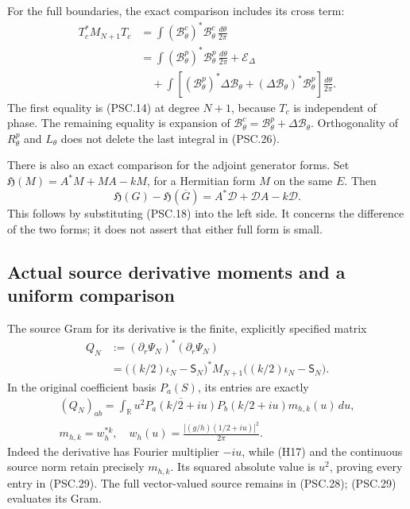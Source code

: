For the full boundaries, the exact comparison includes its cross term:
\[
 \begin{aligned}
 T_c^*M_{N+1}T_c
 &=\int(\mathscr B^c_\theta)^*\mathscr B^c_\theta
             \,\frac{d\theta}{2\pi}\\
 &=\int(\mathscr B^p_\theta)^*\mathscr B^p_\theta
             \,\frac{d\theta}{2\pi}
   +\mathscr E_\Delta\\
 &\quad+\int\left[
       (\mathscr B^p_\theta)^*\Delta\mathscr B_\theta
       +(\Delta\mathscr B_\theta)^*\mathscr B^p_\theta
      \right]\frac{d\theta}{2\pi}.
 \end{aligned}
 \tag{PSC.26}
\]
The first equality is (PSC.14) at degree \(N+1\), because \(T_c\) is independent of phase. The remaining equality is expansion of
\(\mathscr B^c_\theta=\mathscr B^p_\theta+\Delta\mathscr B_\theta\).
Orthogonality of \(R^p_\theta\) and \(L_\theta\) does not delete the last integral in (PSC.26).

There is also an exact comparison for the adjoint generator forms. Set
\(\mathfrak H(M)=A^*M+MA-kM\), for a Hermitian form \(M\) on the same \(E\). Then
\[
 \boxed{
 \mathfrak H(G)-\mathfrak H(\overline G)
 =A^*\mathscr D+\mathscr DA-k\mathscr D.}
 \tag{PSC.27}
\]
This follows by substituting (PSC.18) into the left side. It concerns the difference of the two forms; it does not assert that either full form is small.

\subsection{Actual source derivative moments and a uniform comparison}

The source Gram for its derivative is the finite, explicitly specified matrix
\[
 \begin{aligned}
 Q_N
 &:=(\partial_r\Psi_N)^*(\partial_r\Psi_N)\\
 &=\bigl((k/2)\iota_N-\mathsf S_N\bigr)^*
       M_{N+1}
       \bigl((k/2)\iota_N-\mathsf S_N\bigr).
 \end{aligned}
 \tag{PSC.28}
\]
In the original coefficient basis \(P_a(S)\), its entries are exactly
\[
 \begin{gathered}
 (Q_N)_{ab}
 =\int_{\mathbb R}u^2
       \overline{P_a(k/2+iu)}P_b(k/2+iu)
       m_{h,k}(u)\,du,\\
 m_{h,k}=w_h^{*k},\quad
 w_h(u)=\frac{|(g/h)(1/2+iu)|^2}{2\pi}.
 \end{gathered}
 \tag{PSC.29}
\]
Indeed the derivative has Fourier multiplier \(-iu\), while (H17) and the continuous source norm retain precisely \(m_{h,k}\). Its squared absolute value is \(u^2\), proving every entry in (PSC.29). The full vector-valued source remains in (PSC.28); (PSC.29) evaluates its Gram.

